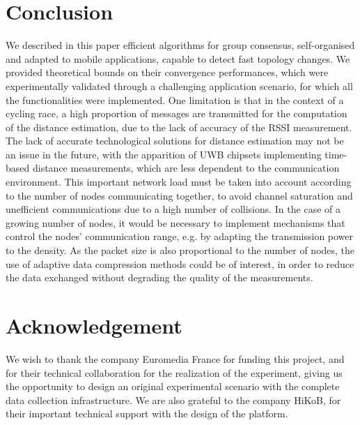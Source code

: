 \documentclass{sig-alternate}
\begin{document}
\section{Conclusion}
We described in this paper efficient algorithms for group consensus, self-organised and adapted to mobile applications, capable to detect fast topology changes. We provided theoretical bounds on their convergence performances, which were experimentally validated through a challenging application scenario, for which all the functionalities were implemented.
One limitation is that in the context of a cycling race, a high proportion of messages are transmitted for the computation of the distance estimation, due to the lack of accuracy of the RSSI measurement.
The lack of accurate technological solutions for distance estimation may not be an issue in the future, with the apparition of UWB chipsets implementing time-based distance measurements, which are less dependent to the communication environment.
This important network load must be taken into account according to the number of nodes communicating together, to avoid channel saturation and unefficient communications due to a high number of collisions.
In the case of a growing number of nodes, it would be necessary to implement mechanisms that control the nodes' communication range, e.g. by adapting the transmission power to the density.
As the packet size is also proportional to the number of nodes, the use of adaptive data compression methods could be of interest, in order to reduce the data exchanged without degrading the quality of the measurements.


\section*{Acknowledgement}
We wish to thank the company Euromedia France for funding this project, and for their technical collaboration for the realization of the experiment, giving us the opportunity to design an original experimental scenario with the complete data collection infrastructure. We are also grateful to the company HiKoB, for their important technical support with the design of the platform.





\end{document}
